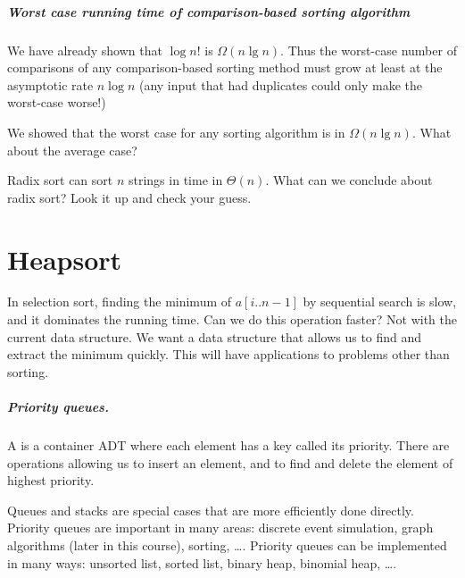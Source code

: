 \paragraph{Worst case running time of comparison-based sorting algorithm}

We have already shown that $\log n!$ is $\Omega (n \lg n)$. Thus the 
worst-case number of comparisons of any comparison-based sorting method must 
grow at least at the asymptotic rate $n \log n$ (any input that had duplicates 
could only make the worst-case worse!)

\begin{Boxample}[4]
We showed that the worst case for any sorting algorithm is in $\Omega (n \lg n)$. What about the average case?

\end{Boxample}

\begin{Boxample}[1]
Radix sort can sort $n$ strings in time in $\Theta(n)$.
 What can we conclude about radix sort? Look it up and check your guess.
\end{Boxample}



\chapter{Heapsort} %
\label{sec:heapsort}

In selection sort, finding the minimum of $a[i..n-1]$ by sequential 
search is slow, and it dominates the running time. Can we do this operation 
faster?
Not with the current data structure. 
We want a data structure that allows us to find and extract the minimum quickly. 
This will have applications to problems other than sorting.


\paragraph{Priority queues.}
\begin{Definition}
A  is a container ADT where each element 
has a key called its priority. There are operations allowing us to insert an 
element, and to find and delete the element of highest priority. 
\end{Definition}
Queues and stacks are special cases that are more efficiently done directly.
Priority queues are important in many areas: discrete event simulation, 
graph algorithms (later in this course), sorting, \dots .
Priority queues can be implemented in many ways: unsorted list, sorted 
list, binary heap, binomial heap, \dots . 

